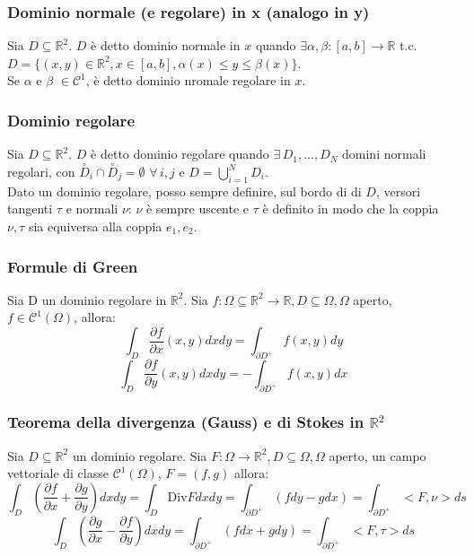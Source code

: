 \documentclass{article} %
\begin{document}
    \subsubsection*{Dominio normale (e regolare) in x (analogo in y)}
    Sia $D \subseteq \mathbb{R}^2$. $D$ è detto dominio normale in $x$ quando $\exists \alpha, \beta : [a,b] \to \mathbb{R}$ t.c. \\ $D = \{ (x,y) \in \mathbb{R}^2, x \in [a,b], \alpha(x) \leq y \leq \beta(x) \}$. \\
    Se $\alpha$ e $\beta$ $\in \mathcal{C}^1$, è detto dominio nromale regolare in $x$.

    \subsubsection*{Dominio regolare}
    Sia $D \subseteq \mathbb{R}^2$. $D$ è detto dominio regolare quando $\exists \, D_1, \dots , D_N$ domini normali regolari, con $\overset{\circ}{D}_i \cap \overset{\circ}{D}_j = \emptyset \, \, \forall \, i,j$ e $ D = \bigcup_{i=1}^{N} D_i$. \\
    Dato un dominio regolare, posso sempre definire, sul bordo di di $D$, versori tangenti $\tau$ e normali $\nu$: $\nu$ è sempre uscente e $\tau$ è definito in modo che la coppia $\nu, \tau$ sia equiversa alla coppia $e_1, e_2$. 

    \subsubsection*{Formule di Green}
    Sia D un dominio regolare in $\mathbb{R}^2$. Sia $f: \Omega \subseteq \mathbb{R}^2 \to \mathbb{R}, D \subseteq \Omega, \Omega$ aperto, $f \in \mathcal{C}^1(\Omega)$, allora: \\
    $$\int_D \frac{\partial f}{\partial x}(x,y) dx dy = \int_{\partial D^+} f(x,y) dy$$
    $$\int_D \frac{\partial f}{\partial y}(x,y) dx dy = - \int_{\partial D^+} f(x,y) dx$$

    \subsubsection*{Teorema della divergenza (Gauss) e di Stokes in $\mathbb{R}^2$}
    Sia $D \subseteq \mathbb{R}^2$ un dominio regolare. Sia $F: \Omega \to \mathbb{R} ^2, D \subseteq \Omega, \Omega$ aperto, un campo vettoriale di classe $\mathcal{C}^1(\Omega)$, $F=(f,g)$ allora: \\
    $$ \int_D \left( \frac{\partial f}{ \partial x} + \frac{\partial g}{ \partial y} \right) dx dy = \int_D \text{Div} F dx dy = \int_{\partial D^+} (f dy - g dx) = \int_{\partial D ^+} < F , \nu > ds $$
    $$ \int_D \left( \frac{\partial g}{ \partial x} - \frac{\partial f}{ \partial y} \right) dx dy = \int_{\partial D^+} (f dx + g dy) = \int_{\partial D ^+} < F , \tau > ds $$
\end{document}
